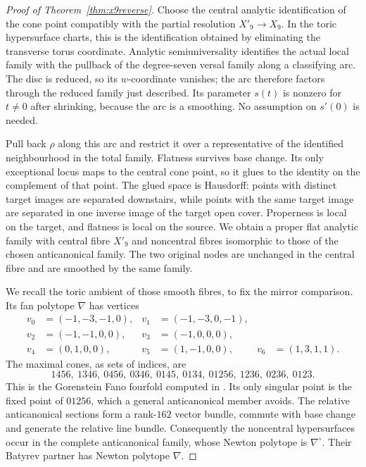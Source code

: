 \begin{proof}[Proof of Theorem~\ref{thm:x9reverse}]
Choose the central analytic identification of the cone point compatibly with the
partial resolution $X'_9\to X_9$. In the toric hypersurface charts,
this is the identification obtained by eliminating the transverse
torus coordinate. Analytic semiuniversality identifies the actual
local family with the pullback of the degree-seven versal family along
a classifying arc. The disc is reduced, so its $w$-coordinate vanishes;
the arc therefore factors through the reduced family just described.
Its parameter $s(t)$ is nonzero for $t\ne0$ after shrinking, because
the arc is a smoothing. No assumption on $s'(0)$ is needed.

Pull back $\rho$ along this arc and restrict it over a representative
of the identified neighbourhood in the total family. Flatness survives
base change. Its only exceptional locus maps to the central cone point,
so it glues to the identity on the complement of that point. The glued
space is Hausdorff: points with distinct target images are separated
downstairs, while points with the same target image are separated in
one inverse image of the target open cover. Properness is local on the
target, and flatness is local on the source. We obtain a proper flat
analytic family with central fibre $X'_9$ and noncentral fibres
isomorphic to those of the chosen anticanonical family. The two original nodes are
unchanged in the central fibre and are smoothed by the same family.

We recall the toric ambient of those smooth fibres, to fix the mirror
comparison. Its fan polytope $\nabla$ has vertices
\begin{equation}\label{eq:x9smoothrays}
\begin{aligned}
 v_0&=(-1,-3,-1,0),&v_1&=(-1,-3,0,-1),\\
 v_2&=(-1,-1,0,0),&v_3&=(-1,0,0,0),\\
 v_4&=(0,1,0,0),&v_5&=(1,-1,0,0),&v_6&=(1,3,1,1).
\end{aligned}
\end{equation}
The maximal cones, as sets of indices, are
\begin{equation}\label{eq:x9smoothcones}
 1456,\ 1346,\ 0456,\ 0346,\ 0145,\ 0134,\ 01256,\ 1236,\ 0236,\ 0123.
\end{equation}
This is the Gorenstein Fano fourfold computed in \cite{Paper5}. Its
only singular point is the fixed point of $01256$, which a general
anticanonical member avoids. The relative anticanonical sections form a
rank-$162$ vector bundle, commute with base change and generate the
relative line bundle. Consequently the noncentral hypersurfaces occur
in the complete anticanonical family, whose Newton polytope is
$\nabla^\circ$. Their Batyrev partner has Newton polytope $\nabla$.


\end{proof}
